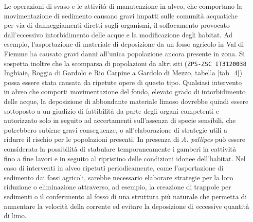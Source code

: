 \documentclass[11pt,a4paper,italian,twoside,openany]{memoir}
\begin{document}
Le operazioni di svaso e le attività di manutenzione in alveo, che comportano la movimentazione di sedimento causano gravi impatti sulle comunità acquatiche per via di danneggiamenti diretti sugli organismi, il soffocamento provocato dall'eccessivo intorbidimento delle acque e la modificazione degli habitat. Ad esempio, l'asportazione di materiale di deposizione da un fosso agricolo in Val di Fiemme ha causato gravi danni all'unica popolazione ancora presente in zona. Si sospetta inoltre che la scomparsa di popolazioni da altri siti (\texttt{ZPS-ZSC IT3120038} Inghiaie, Roggia di Gardolo e Rio Carpine a Gardolo di Mezzo, tabella \ref{tab_4}) possa essere stata causata da ripetute opere di questo tipo. Qualsiasi intervento in alveo che comporti movimentazione del fondo, elevato grado di intorbidimento delle acque, la deposizione di abbondante materiale limoso dovrebbe quindi essere sottoposto a un giudizio di fattibilità da parte degli organi competenti e autorizzato solo in seguito ad accertamenti sull'assenza di specie sensibili, che potrebbero subirne gravi conseguenze, o all'elaborazione di strategie utili a ridurre il rischio per le popolazioni presenti. In presenza di \emph{A. pallipes} può essere considerata la possibilità di stabulare temporaneamente i gamberi in cattività fino a fine lavori e in seguito al ripristino delle condizioni idonee dell'habitat. Nel caso di interventi in alveo ripetuti periodicamente, come l'asportazione di sedimento dai fossi agricoli, sarebbe necessario elaborare strategie per la loro riduzione o eliminazione attraverso, ad esempio, la creazione di trappole per sedimenti o il conferimento al fosso di una struttura più naturale che permetta di aumentare la velocità della corrente ed evitare la deposizione di eccessive quantità di limo. 
\end{document}
